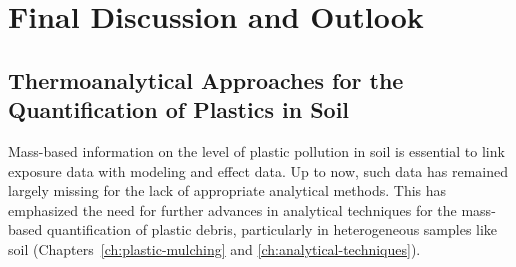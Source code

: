 
\chapter{Final Discussion and Outlook}
\label{ch:general-discussion}

\section{Thermoanalytical Approaches for the Quantification of Plastics in Soil}
\label{sec:general-discussion:analytics}

Mass-based information on the level of plastic pollution in soil is essential to link exposure data with modeling and effect data. Up to now, such data has remained largely missing for the lack of appropriate analytical methods. This has emphasized the need for further advances in analytical techniques for the mass-based quantification of plastic debris, particularly in heterogeneous samples like soil (Chapters~\ref{ch:plastic-mulching} and \ref{ch:analytical-techniques}).

